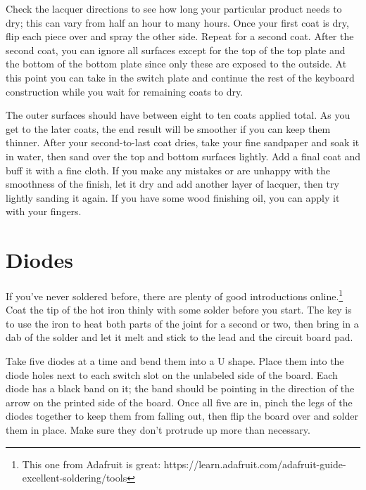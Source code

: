 \documentclass{article}
\begin{document}
\vspace{1em}

Check the lacquer directions to see how long your particular product
needs to dry; this can vary from half an hour to many hours. Once your
first coat is dry, flip each piece over and spray the other
side. Repeat for a second coat. After the second coat, you can ignore
all surfaces except for the top of the top plate and the bottom of the
bottom plate since only these are exposed to the outside. At this
point you can take in the switch plate and continue the rest of the
keyboard construction while you wait for remaining coats to dry.

\vspace{1em}

The outer surfaces should have between eight to ten coats applied
total. As you get to the later coats, the end result will be smoother
if you can keep them thinner. After your second-to-last coat dries,
take your fine sandpaper and soak it in water, then sand over the top and
bottom surfaces lightly. Add a final coat and buff it with a fine
cloth. If you make any mistakes or are unhappy with the smoothness of
the finish, let it dry and add another layer of lacquer, then try
lightly sanding it again. If you have some wood finishing oil, you can
apply it with your fingers.

\section{Diodes}

If you've never soldered before, there are plenty of good
introductions online.\footnote{This one from Adafruit is great:
  https://learn.adafruit.com/adafruit-guide-excellent-soldering/tools}
Coat the tip of the hot iron thinly with some solder before you
start. The key is to use the iron to heat both parts of the joint for
a second or two, then bring in a dab of the solder and let it melt and
stick to the lead and the circuit board pad.

\vspace{1em}

Take five diodes at a time and bend them into a U shape. Place them
into the diode holes next to each switch slot on the unlabeled side of
the board. Each diode has a black band on it; the band should be
pointing in the direction of the arrow on the printed side of the
board. Once all five are in, pinch the legs of the diodes together to
keep them from falling out, then flip the board over and solder them
in place. Make sure they don't protrude up more than necessary.
\end{document}
